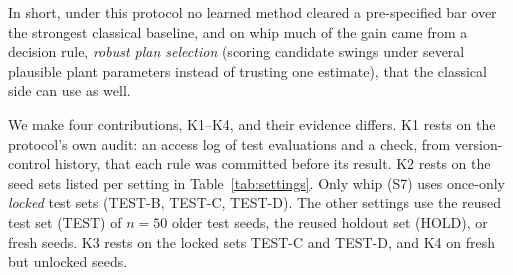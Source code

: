 In short, under this protocol no learned method cleared a pre-specified bar over the strongest classical baseline, and on whip much of the gain came from a decision rule, \emph{robust plan selection} (scoring candidate swings under several plausible plant parameters instead of trusting one estimate), that the classical side can use as well.

We make four contributions, K1--K4, and their evidence differs. K1 rests on the protocol's own audit: an access log of test evaluations and a check, from version-control history, that each rule was committed before its result. K2 rests on the seed sets listed per setting in Table~\ref{tab:settings}. Only whip (S7) uses once-only \emph{locked} test sets (TEST-B, TEST-C, TEST-D). The other settings use the reused test set (TEST) of $n{=}50$ older test seeds, the reused holdout set (HOLD), or fresh seeds. K3 rests on the locked sets TEST-C and TEST-D, and K4 on fresh but unlocked seeds.
